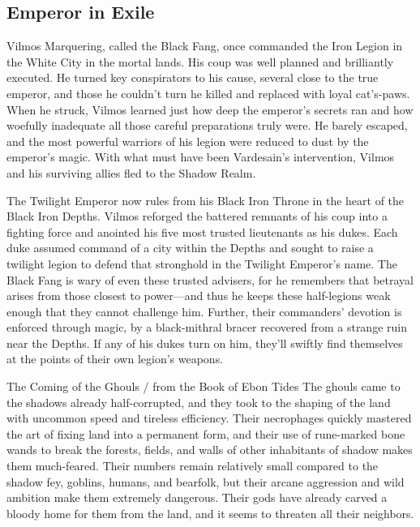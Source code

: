 \documentclass[10pt,a4paper,twoside,bg=print,twocolumn,openany,nodeprecatedcode]{dndbook}
\begin{document}
\subsection{Emperor in Exile}
Vilmos Marquering, called the Black Fang, once commanded the Iron Legion in the White City in the mortal lands. His coup was well planned and brilliantly executed. He turned key conspirators to his cause, several close to the true emperor, and those he couldn't turn he killed and replaced with loyal cat's-paws. When he struck, Vilmos learned just how deep the emperor's secrets ran and how woefully inadequate all those careful preparations truly were. He barely escaped, and the most powerful warriors of his legion were reduced to dust by the emperor's magic. With what must have been Vardesain's intervention, Vilmos and his surviving allies fled to the Shadow Realm.

The Twilight Emperor now rules from his Black Iron Throne in the heart of the Black Iron Depths. Vilmos reforged the battered remnants of his coup into a fighting force and anointed his five most trusted lieutenants as his dukes. Each duke assumed command of a city within the Depths and sought to raise a twilight legion to defend that stronghold in the Twilight Emperor's name. The Black Fang is wary of even these trusted advisers, for he remembers that betrayal arises from those closest to power—and thus he keeps these half-legions weak enough that they cannot challenge him. Further, their commanders' devotion is enforced through magic, by a black-mithral bracer recovered from a strange ruin near the Depths. If any of his dukes turn on him, they'll swiftly find themselves at the points of their own legion's weapons.

\begin{DndSidebar}[float=!b]{The Coming of the Ghouls / from the Book of Ebon Tides}
The ghouls came to the shadows already half-corrupted, and they took to the shaping of the land with uncommon speed and tireless efficiency. Their necrophages quickly mastered the art of fixing land into a permanent form, and their use of rune-marked bone wands to break the forests, fields, and walls of other inhabitants of shadow makes them much-feared. Their numbers remain relatively small compared to the shadow fey, goblins, humans, and bearfolk, but their arcane aggression and wild ambition make them extremely dangerous. Their gods have already carved a bloody home for them from the land, and it seems to threaten all their neighbors.



\end{DndSidebar}
\end{document}
